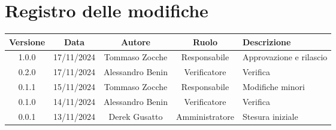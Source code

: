 \section*{Registro delle modifiche}
\begin{table}[H]
    \begin{tabular}{|c|c|c|c|p{3cm}|}
        \hline
        \textbf{Versione} & \textbf{Data} & \textbf{Autore} & \textbf{Ruolo} & \textbf{Descrizione} \\
        \hline
        1.0.0 & 17/11/2024 & Tommaso Zocche & Responsabile & Approvazione e rilascio \\
        \hline
        0.2.0 & 17/11/2024 & Alessandro Benin & Verificatore & Verifica \\
        \hline
        0.1.1 & 15/11/2024 & Tommaso Zocche & Responsabile & Modifiche minori \\
        \hline
        0.1.0 & 14/11/2024 & Alessandro Benin & Verificatore & Verifica \\
        \hline
        0.0.1 & 13/11/2024 & Derek Gusatto & Amministratore & Stesura iniziale \\
        \hline
    \end{tabular}
\end{table}
